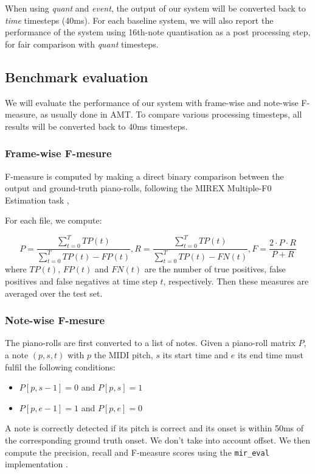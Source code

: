\documentclass{article}
\begin{document}
When using \emph{quant} and \emph{event}, the output of our system will be converted back to \emph{time} timesteps (40ms).
For each baseline system, we will also report the performance of the system using 16th-note quantisation as a post processing step, for fair comparison with \emph{quant} timesteps.

\subsection{Benchmark evaluation}

We will evaluate the performance of our system with frame-wise and note-wise F-measure, as usually done in AMT.
To compare various processing timesteps, all results will be converted back to 40ms timesteps.

\subsubsection{Frame-wise F-mesure}

F-measure is computed by making a direct binary comparison between the output and ground-truth piano-rolls, following the MIREX Multiple-F0 Estimation task \citep{Bay2009}, 

For each file, we compute:

\[
P = \frac{\sum_{t=0}^{T}TP(t)}{\sum_{t=0}^{T}TP(t) - FP(t)} ,
R = \frac{\sum_{t=0}^{T}TP(t)}{\sum_{t=0}^{T}TP(t) - FN(t)} ,
F = \frac{2 \cdot P \cdot R}{P + R} 
\]
where $TP(t)$, $FP(t)$ and $FN(t)$ are the number of true positives, false positives and false negatives at time step $t$, respectively. 
Then these measures are averaged over the test set.

\subsubsection{Note-wise F-mesure}

The piano-rolls are first converted to a list of notes.
Given a piano-roll matrix $P$, a note $(p,s,t)$ with $p$ the MIDI pitch, $s$ its start time and $e$ its end time must fulfil the following conditions:

\begin{itemize}
\item $P[p,s-1] = 0$ and $P[p,s] = 1$
\item $P[p,e-1] = 1$ and $P[p,e] = 0$
\end{itemize}

A note is correctly detected if its pitch is correct and its onset is within 50ms of the corresponding ground truth onset. We don't take into account offset.
We then compute the precision, recall and F-measure scores using the \texttt{mir\_eval} implementation \citep{raffel2014mireval}.
\end{document}

